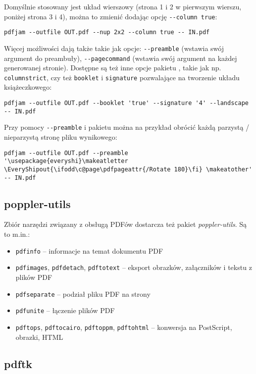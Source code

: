 \documentclass[fontSize=10pt, rmargin=3cm, extra]{pdfArticle}
\begin{document}
Domyślnie stosowany jest układ wierszowy (strona 1 i 2 w pierwszym wierszu, poniżej strona 3 i 4), można to zmienić dodając opcję \Verb$--column true$:
\begin{verbatim}
pdfjam --outfile OUT.pdf --nup 2x2 --column true -- IN.pdf
\end{verbatim}

Więcej możliwości dają także takie jak opcje: \Verb$--preamble$ (wstawia swój argument do preambuły), \Verb$--pagecommand$ (wstawia swój argument na każdej generowanej stronie).
Dostępne są też inne opcje pakietu , takie jak np. \Verb$columnstrict$, czy też  \Verb$booklet$ i \Verb$signature$ pozwalające na tworzenie układu książeczkowego:

\begin{verbatim}
pdfjam --outfile OUT.pdf --booklet 'true' --signature '4' --landscape -- IN.pdf
\end{verbatim}

Przy pomocy \Verb$--preamble$ i pakietu  można na przykład obrócić każdą parzystą / nieparzystą stronę pliku wynikowego:
\begin{verbatim}
pdfjam --outfile OUT.pdf --preamble '\usepackage{everyshi}\makeatletter \EveryShipout{\ifodd\c@page\pdfpageattr{/Rotate 180}\fi} \makeatother' -- IN.pdf
\end{verbatim}


\subsection{poppler-utils}

Zbiór narzędzi związany z obsługą PDFów dostarcza też pakiet \textit{poppler-utils}. Są to m.in.:

\begin{itemize}
	\item \Verb$pdfinfo$ – informacje na temat dokumentu PDF
	\item \Verb$pdfimages$, \Verb$pdfdetach$, \Verb$pdftotext$ – eksport obrazków, załączników i tekstu z plików PDF
	\item \Verb$pdfseparate$ – podział pliku PDF na strony
	\item \Verb$pdfunite$ – łączenie plików PDF
	\item \Verb$pdftops$, \Verb$pdftocairo$, \Verb$pdftoppm$, \Verb$pdftohtml$ – konwersja na PostScript, obrazki, HTML
\end{itemize}


\subsection{pdftk}
\end{document}
